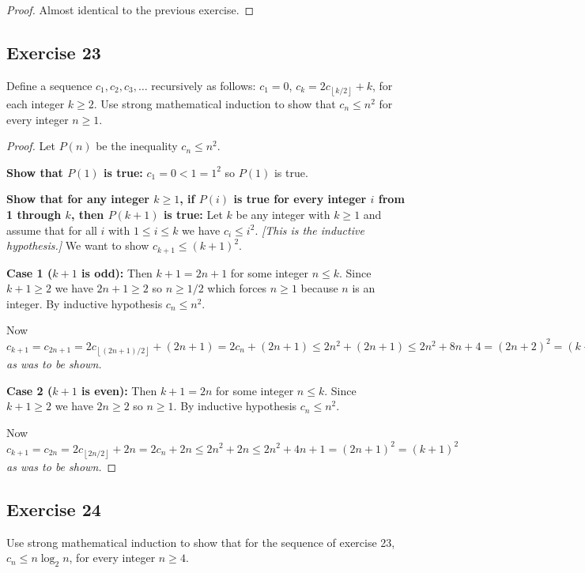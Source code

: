 \documentclass[14pt]{extarticle}
\newcommand{\floor}[1]{{\left\lfloor#1\right\rfloor}}
\begin{document}
\begin{proof}
    Almost identical to the previous exercise.
\end{proof}

\subsection{Exercise 23}
Define a sequence \(c_1, c_2, c_3, \ldots\) recursively as follows: \(c_1 = 0\), \(c_k = 2c_{\floor{k/2}} + k\), for each
integer \(k \geq 2\). Use strong mathematical induction to show that \(c_n \leq n^2\) for every integer \(n \geq 1\).

\begin{proof}
    Let \(P(n)\) be the inequality \(c_n \leq n^2\).

        {\bf Show that \(P(1)\) is true:} \(c_1 = 0 < 1 = 1^2\) so \(P(1)\) is true.

        {\bf Show that for any integer \(k \geq 1\), if \(P(i)\) is true for every integer \(i\) from 1 through \(k\), then
            \(P(k + 1)\) is true:} Let \(k\) be any integer with \(k \geq 1\) and assume that for all \(i\) with \(1 \leq i \leq k\) we
    have \(c_i \leq i^2\). {\it [This is the inductive hypothesis.]} We want to show \(c_{k+1} \leq (k+1)^2\).

        {\bf Case 1 (\(k+1\) is odd):} Then \(k+1 = 2n+1\) for some integer \(n\leq k\). Since \(k+1\geq2\) we have \(2n+1\geq 2\)
    so \(n \geq 1/2\) which forces \(n \geq 1\) because \(n\) is an integer. By inductive hypothesis \(c_n \leq n^2\).

    Now \(c_{k+1} = c_{2n+1} = 2c_{\floor{(2n+1)/2}} + (2n+1) = 2c_n + (2n+1) \leq 2n^2 + (2n+1) \leq 2n^2 + 8n + 4 = (2n+2)^2
    = (k+1)^2\) {\it as was to be shown.}

        {\bf Case 2 (\(k+1\) is even):} Then \(k+1 = 2n\) for some integer \(n\leq k\). Since \(k+1\geq2\) we have \(2n \geq 2\)
    so \(n \geq 1\). By inductive hypothesis \(c_n \leq n^2\).

    Now \(c_{k+1} = c_{2n} = 2c_{\floor{2n/2}} + 2n = 2c_n + 2n \leq 2n^2 + 2n \leq 2n^2 + 4n + 1 = (2n+1)^2 = (k+1)^2\)
    {\it as was to be shown.}
\end{proof}

\subsection{Exercise 24}
Use strong mathematical induction to show that for the sequence of exercise 23,\(c_n \leq n \log_2 n\), for every
integer \(n \geq 4\).
\end{document}
